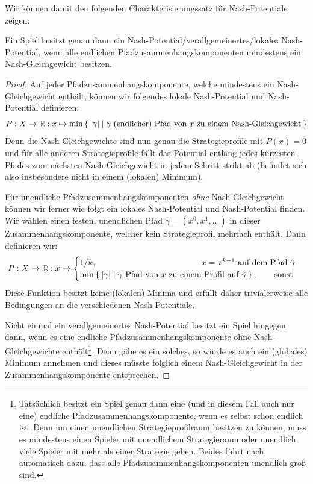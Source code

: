 Wir können damit den folgenden Charakterisierungssatz für Nash-Potentiale zeigen:

\begin{satz}\label{satz:CharExNashPot}
	Ein Spiel besitzt genau dann ein Nash-Potential/verallgemeinertes/lokales Nash-Potential, wenn alle endlichen Pfadzusammenhangskomponenten mindestens ein Nash-Gleichgewicht besitzen.
\end{satz}

\begin{proof}
	Auf jeder Pfadzusammenhangskomponente, welche mindestens ein Nash-Gleich\-ge\-wicht enthält, können wir folgendes lokale Nash-Potential und Nash-Potential definieren:
	\[P: X \to \mathbb{R}: x \mapsto \min\Set{\left|\gamma\right| | \gamma \text{ (endlicher) Pfad von } x \text{ zu einem Nash-Gleichgewicht}} \]
	Denn die Nash-Gleichgewichte sind nun genau die Strategieprofile mit $P(x) = 0$ und für alle anderen Strategieprofile fällt das Potential entlang jedes kürzesten Pfades zum nächsten Nash-Gleichgewicht in jedem Schritt strikt ab (befindet sich also insbesondere nicht in einem (lokalen) Minimum).
	
	Für unendliche Pfadzusammenhangskomponenten \emph{ohne} Nash-Gleichgewicht können wir ferner wie folgt ein lokales Nash-Potential und Nash-Potential finden. Wir wählen einen festen, unendlichen Pfad $\hat{\gamma} = (x^0, x^1, \dots)$ in dieser Zusammenhangskomponente, welcher kein Strategieprofil mehrfach enthält. Dann definieren wir:
	\[P: X \to \IR: x \mapsto \begin{cases}
	1/k, \hspace{12.5em} x = x^{k-1} \text{ auf dem Pfad } \hat{\gamma} \\
	\min\Set{\abs{\gamma} | \gamma \text{ Pfad von $x$ zu einem Profil auf $\hat{\gamma}$}}, \qquad\text{sonst}
	\end{cases}\]
	Diese Funktion besitzt keine (lokalen) Minima und erfüllt daher trivialerweise alle Bedingungen an die verschiedenen Nash-Potentiale.
	
	Nicht einmal ein verallgemeinertes Nash-Potential besitzt ein Spiel hingegen dann, wenn es eine endliche Pfadzusammenhangskomponente ohne Nash-Gleichgewichte enthält\footnote{Tatsächlich besitzt ein Spiel genau dann eine (und in diesem Fall auch nur eine) endliche Pfadzusammenhangskomponente, wenn es selbst schon endlich ist. Denn um einen unendlichen Strategieprofilraum besitzen zu können, muss es mindestens einen Spieler mit unendlichem Strategieraum oder unendlich viele Spieler mit mehr als einer Strategie geben. Beides führt nach  automatisch dazu, dass alle Pfadzusammenhangskomponenten unendlich groß sind.}. Denn gäbe es ein solches, so würde es auch ein (globales) Minimum annehmen und dieses müsste folglich einem Nash-Gleichgewicht in der Zusammenhangskomponente entsprechen.
\end{proof}

